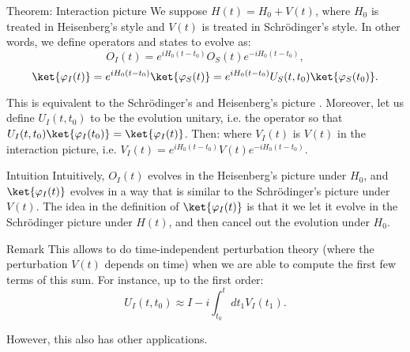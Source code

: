 \documentclass[a4paper]{article}
\begin{document}
\begin{parag}{Theorem: Interaction picture}
    We suppose $H\left(t\right) = H_0 + V\left(t\right)$, where $H_0$ is treated in Heisenberg's style and $V\left(t\right)$ is treated in Schrödinger's style. In other words, we define operators and states to evolve as: 
    \[O_I\left(t\right) = e^{i H_0\left(t- t_0\right)} O_S\left(t\right) e^{-i H_0\left(t- t_0\right)},\]
    \[\ket{\phi_I\left(t\right)} = e^{i H_0\left(t - t_0\right)} \ket{\phi_S\left(t\right)} = e^{i H_0\left(t- t_0\right)} U_S\left(t, t_0\right) \ket{\phi_S\left(t_0\right)}.\]

    This is equivalent to the Schrödinger's and Heisenberg's picture . Moreover, let us define $U_I\left(t, t_0\right)$ to be the evolution unitary, i.e. the operator so that $U_I\left(t, t_0\right) \ket{\phi_I\left(t_0\right)} = \ket{\phi_I\left(t\right)}$. Then:
    where $V_I\left(t\right)$ is $V\left(t\right)$ in the interaction picture, i.e. $V_I\left(t\right) = e^{i H_0\left(t- t_0\right)} V\left(t\right) e^{-i H_0\left(t- t_0\right)}$.

    \begin{subparag}{Intuition}
        Intuitively, $O_I\left(t\right)$ evolves in the Heisenberg's picture under $H_0$, and $\ket{\phi_I\left(t\right)}$ evolves in a way that is similar to the Schrödinger's picture under $V\left(t\right)$. The idea in the definition of $\ket{\phi_I\left(t\right)}$ is that it we let it evolve in the Schrödinger picture under $H\left(t\right)$, and then cancel out the evolution under $H_0$.
    \end{subparag}

    \begin{subparag}{Remark}
        This allows to do time-independent perturbation theory (where the perturbation $V\left(t\right)$ depends on time) when we are able to compute the first few terms of this sum. For instance, up to the first order:
        \[U_I\left(t, t_0\right) \approx I - i \int_{t_0}^{t} dt_1 V_I\left(t_1\right).\]

        However, this also has other applications.
    \end{subparag}
    

\end{parag}
\end{document}
